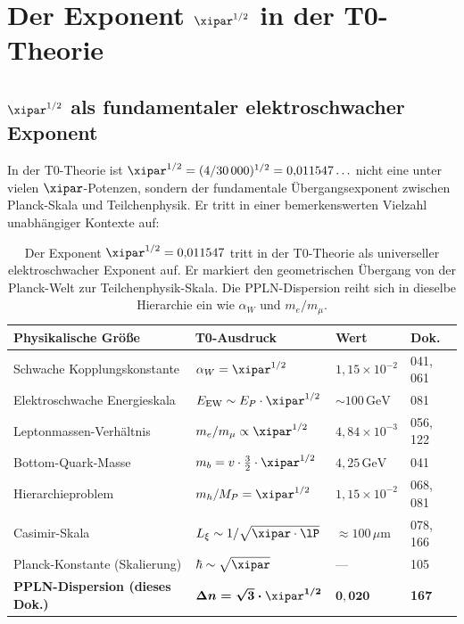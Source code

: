 \clearpage

\section{%
  Der Exponent \texorpdfstring{$\xipar^{1/2}$}{xi\^{}(1/2)} in der T0-Theorie}
\label{sec:xi_halb}

\subsection{%
  \texorpdfstring{$\xipar^{1/2}$}{xi\^{}(1/2)} als fundamentaler
  elektroschwacher Exponent}

In der T0-Theorie ist $\xipar^{1/2} = (4/30\,000)^{1/2} = 0{,}011547\ldots$
nicht eine unter vielen $\xipar$-Potenzen, sondern der fundamentale
Übergangsexponent zwischen Planck-Skala und Teilchenphysik. Er tritt in
einer bemerkenswerten Vielzahl unabhängiger Kontexte auf:

\begin{table}[H]
    \centering
    \begin{tabular}{llll}
        \toprule
        \textbf{Physikalische Größe} & \textbf{T0-Ausdruck} &
        \textbf{Wert} & \textbf{Dok.} \\
        \midrule
        Schwache Kopplungskonstante &
            $\alpha_W = \xipar^{1/2}$ &
            $1{,}15 \times 10^{-2}$ & 041, 061 \\
        Elektroschwache Energieskala &
            $E_\mathrm{EW} \sim E_P \cdot \xipar^{1/2}$ &
            $\sim 100\,\text{GeV}$ & 081 \\
        Leptonmassen-Verhältnis &
            $m_e/m_\mu \propto \xipar^{1/2}$ &
            $4{,}84 \times 10^{-3}$ & 056, 122 \\
        Bottom-Quark-Masse &
            $m_b = v \cdot \tfrac{3}{2}\cdot\xipar^{1/2}$ &
            $4{,}25\,\text{GeV}$ & 041 \\
        Hierarchieproblem &
            $m_h/M_P = \xipar^{1/2}$ &
            $1{,}15 \times 10^{-2}$ & 068, 081 \\
        Casimir-Skala &
            $L_\xi \sim 1/\sqrt{\xipar \cdot \lP}$ &
            $\approx 100\,\mu\text{m}$ & 078, 166 \\
        Planck-Konstante (Skalierung) &
            $\hbar \sim \sqrt{\xipar}$ & — & 105 \\
        \textbf{PPLN-Dispersion (dieses Dok.)} &
            $\boldsymbol{\Delta n = \sqrt{3}\cdot\xipar^{1/2}}$ &
            $\mathbf{0{,}020}$ & \textbf{167} \\
        \bottomrule
    \end{tabular}
    \caption{Der Exponent $\xipar^{1/2} = 0{,}011547$ tritt in der T0-Theorie
    als universeller elektroschwacher Exponent auf. Er markiert den geometrischen
    Übergang von der Planck-Welt zur Teilchenphysik-Skala. Die PPLN-Dispersion
    reiht sich in dieselbe Hierarchie ein wie $\alpha_W$ und $m_e/m_\mu$.}
    \label{tab:xi12}
\end{table}

